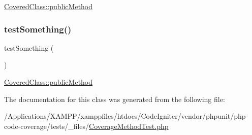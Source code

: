 \mbox{\hyperlink{class_covered_class_ab07dfd901b43d1dcdbc2d116d7f5a566}{Covered\+Class\+::public\+Method}} \mbox{\label{class_coverage_method_test_a0fc4e17369bc9607ebdd850d9eda8167}} 
\subsubsection{\texorpdfstring{test\+Something()}{testSomething()}\hspace{0.1cm}{\footnotesize\ttfamily [2/2]}}
{\footnotesize\ttfamily test\+Something (\begin{DoxyParamCaption}{ }\end{DoxyParamCaption})}

\mbox{\hyperlink{class_covered_class_ab07dfd901b43d1dcdbc2d116d7f5a566}{Covered\+Class\+::public\+Method}} 

The documentation for this class was generated from the following file\+:\begin{DoxyCompactItemize}
\item 
/\+Applications/\+X\+A\+M\+P\+P/xamppfiles/htdocs/\+Code\+Igniter/vendor/phpunit/php-\/code-\/coverage/tests/\+\_\+files/\mbox{\hyperlink{php-code-coverage_2tests_2__files_2_coverage_method_test_8php}{Coverage\+Method\+Test.\+php}}\end{DoxyCompactItemize}
